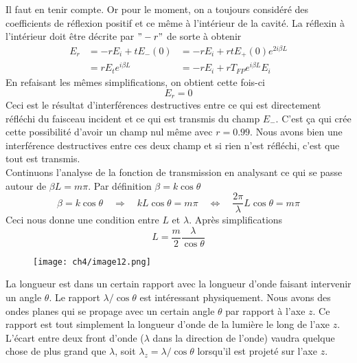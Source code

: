 Il faut en tenir compte. Or pour le moment, on a toujours considéré des coefficients de 
réflexion positif et ce même à l'intérieur de la cavité. La réflexin à l'intérieur doit 
être décrite par $"-r"$ de sorte à obtenir
\begin{equation}
\begin{array}{lll}
E_r &= -rE_i+tE_-(0) &= -rE_i +rtE_+(0)e^{2i\beta L}\\
&= rE_te^{i\beta L} &= -rE_i+rT_{FP}e^{i\beta L}E_i
\end{array}
\end{equation}
En refaisant les mêmes simplifications, on obtient cette fois-ci 
\begin{equation}
E_r = 0
\end{equation}
Ceci est le résultat d'interférences destructives entre ce qui est directement réfléchi
du faisceau incident et ce qui est transmis du champ $E_-$. C'est ça qui crée cette 
possibilité d'avoir un champ nul même avec $r=0.99$. Nous avons bien une interférence 
destructives entre ces deux champ et si rien n'est réfléchi, c'est que tout est transmis.\\

Continuons l'analyse de la fonction de transmission en analysant ce qui se passe autour de 
$\beta L = m\pi$. Par définition $\beta = k\cos\theta$
\begin{equation}
\beta = k\cos\theta\quad\Rightarrow\quad kL\cos\theta = m\pi\quad\Leftrightarrow\quad 
\dfrac{2\pi}{\lambda}L\cos\theta = m\pi
\end{equation}
Ceci nous donne une condition entre $L$ et $\lambda$. Après simplifications
\begin{equation}
L = \frac{m}{2}\frac{\lambda}{\cos\theta}
\end{equation}

	\begin{wrapfigure}[7]{r}{4.5cm}
	\vspace{-5mm}
	\texttt{[image: ch4/image12.png]}
	\end{wrapfigure}
La longueur est dans un certain rapport avec la longueur d'onde faisant intervenir un 
angle $\theta$. Le rapport $\lambda/\cos\theta$ est intéressant physiquement. Nous avons 
des ondes planes qui se propage avec un certain angle $\theta$ par rapport à l'axe $z$. Ce 
rapport est tout simplement la longueur d'onde de la lumière le long de l'axe $z$. L’écart 
entre deux front d'onde ($\lambda$ dans la direction de l'onde) vaudra quelque chose de plus 
grand que $\lambda$, soit $\lambda_z = \lambda/\cos\theta$ lorsqu'il est projeté sur l'axe $z$.\\

